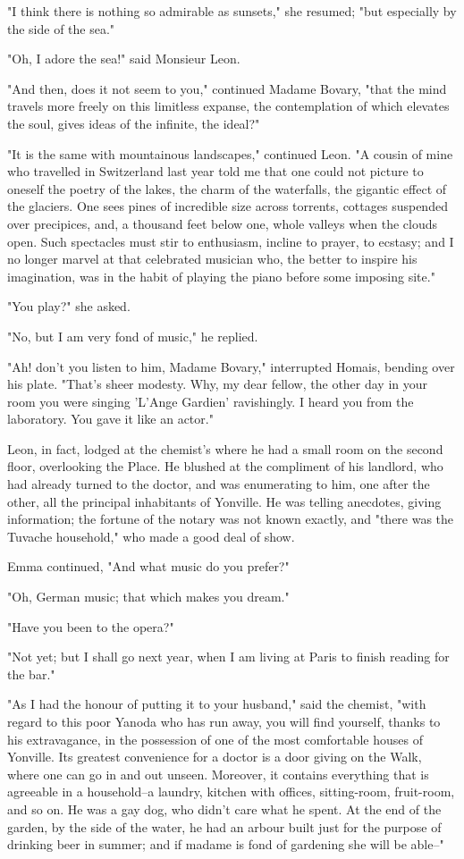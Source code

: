 \documentclass{tufte-book}
\begin{document}
"I think there is nothing so admirable as sunsets," she resumed; "but
especially by the side of the sea."

"Oh, I adore the sea!" said Monsieur Leon.

"And then, does it not seem to you," continued Madame Bovary, "that the
mind travels more freely on this limitless expanse, the contemplation of
which elevates the soul, gives ideas of the infinite, the ideal?"

"It is the same with mountainous landscapes," continued Leon. "A cousin
of mine who travelled in Switzerland last year told me that one could
not picture to oneself the poetry of the lakes, the charm of the
waterfalls, the gigantic effect of the glaciers. One sees pines of
incredible size across torrents, cottages suspended over precipices,
and, a thousand feet below one, whole valleys when the clouds open. Such
spectacles must stir to enthusiasm, incline to prayer, to ecstasy; and I
no longer marvel at that celebrated musician who, the better to inspire
his imagination, was in the habit of playing the piano before some
imposing site."

"You play?" she asked.

"No, but I am very fond of music," he replied.

"Ah! don't you listen to him, Madame Bovary," interrupted Homais,
bending over his plate. "That's sheer modesty. Why, my dear fellow, the
other day in your room you were singing 'L'Ange Gardien' ravishingly. I
heard you from the laboratory. You gave it like an actor."

Leon, in fact, lodged at the chemist's where he had a small room on the
second floor, overlooking the Place. He blushed at the compliment of his
landlord, who had already turned to the doctor, and was enumerating to
him, one after the other, all the principal inhabitants of Yonville. He
was telling anecdotes, giving information; the fortune of the notary
was not known exactly, and "there was the Tuvache household," who made a
good deal of show.

Emma continued, "And what music do you prefer?"

"Oh, German music; that which makes you dream."

"Have you been to the opera?"

"Not yet; but I shall go next year, when I am living at Paris to finish
reading for the bar."

"As I had the honour of putting it to your husband," said the chemist,
"with regard to this poor Yanoda who has run away, you will find
yourself, thanks to his extravagance, in the possession of one of the
most comfortable houses of Yonville. Its greatest convenience for a
doctor is a door giving on the Walk, where one can go in and out unseen.
Moreover, it contains everything that is agreeable in a household--a
laundry, kitchen with offices, sitting-room, fruit-room, and so on. He
was a gay dog, who didn't care what he spent. At the end of the garden,
by the side of the water, he had an arbour built just for the purpose of
drinking beer in summer; and if madame is fond of gardening she will be
able--"
\end{document}
